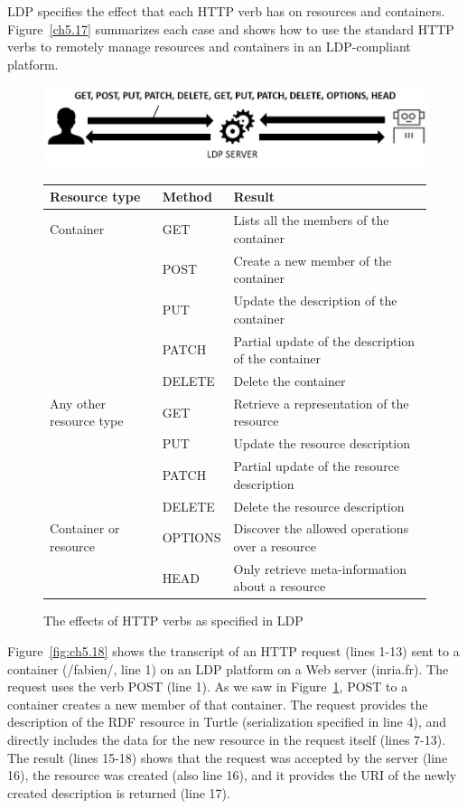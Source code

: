 LDP specifies the effect that each HTTP verb has on resources and
containers. Figure~\ref{ch5.17} summarizes each case and shows how to use the standard HTTP verbs to 
remotely manage
resources and containers in an LDP-compliant platform. 


\begin{figure}
\includegraphics[width=5.0in]{media/ch5/figure-05-17.jpg}
\begin{tabular}{|lll|}
\hline
\textbf{Resource type} & \textbf{Method} & \textbf{Result}\tabularnewline
\hline\hline
Container & GET & Lists all the members of the container\tabularnewline
& POST & Create a new member of the container\tabularnewline
& PUT & Update the description of the container\tabularnewline
& PATCH & Partial update of the description of the
container\tabularnewline
& DELETE & Delete the container\tabularnewline
\hline
Any other resource type & GET & Retrieve a representation of the
resource\tabularnewline
& PUT & Update the resource description\tabularnewline
& PATCH & Partial update of the resource description\tabularnewline
& DELETE & Delete the resource description\tabularnewline
\hline\hline
Container or resource & OPTIONS & Discover the allowed operations over a
resource\tabularnewline
& HEAD & Only retrieve meta-information about a resource\tabularnewline
\hline
\end{tabular}
 \label{fig:ch5.17}
 \caption{The effects of HTTP verbs as specified in LDP}
\end{figure}


Figure~\ref{fig:ch5.18} shows the transcript of an HTTP request (lines 1-13) sent to a
container (/fabien/, line 1) on an LDP platform on a Web server
(inria.fr). The request uses the verb POST (line 1). As we saw in 
Figure~\ref{fig:ch5.17}, POST to a container creates a new member of that container. The
request provides the description of the RDF resource in Turtle
(serialization specified in line 4), and directly includes the data for
the new resource in the request itself (lines 7-13). The result (lines
15-18) shows that the request was accepted by the server (line 16), the
resource was created (also line 16), and it provides the URI of the
newly created description is returned (line 17).

